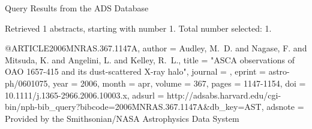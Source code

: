 Query Results from the ADS Database


Retrieved 1 abstracts, starting with number 1.  Total number selected: 1.

@ARTICLE{2006MNRAS.367.1147A,
   author = {{Audley}, M.~D. and {Nagase}, F. and {Mitsuda}, K. and {Angelini}, L. and 
	{Kelley}, R.~L.},
    title = "{ASCA observations of OAO 1657-415 and its dust-scattered X-ray halo}",
  journal = {\mnras},
   eprint = {astro-ph/0601075},
     year = 2006,
    month = apr,
   volume = 367,
    pages = {1147-1154},
      doi = {10.1111/j.1365-2966.2006.10003.x},
   adsurl = {http://adsabs.harvard.edu/cgi-bin/nph-bib_query?bibcode=2006MNRAS.367.1147A&db_key=AST},
  adsnote = {Provided by the Smithsonian/NASA Astrophysics Data System}
}


